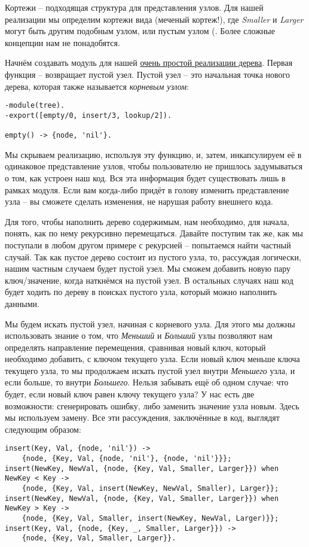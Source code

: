 Кортежи \--- подходящая структура для представления узлов.
Для нашей реализации мы определим кортежи вида  (меченый кортеж!), где \emph{Smaller} и \emph{Larger} могут быть другим подобным узлом, или пустым узлом (.
Более сложные концепции нам не понадобятся.

Начнём создавать модуль для нашей \href{http://learnyousomeerlang.com/static/erlang/tree.erl}{очень простой реализации дерева}.
Первая функция  \--- возвращает пустой узел.
Пустой узел \--- это начальная точка нового дерева, которая также называется \emph{корневым узлом}:
\begin{lstlisting}[style=erlang]
-module(tree).
-export([empty/0, insert/3, lookup/2]).
 
empty() -> {node, 'nil'}.
\end{lstlisting}

Мы скрываем реализацию, используя эту функцию, и, затем, инкапсулируем её в одинаковое представление узлов, чтобы пользователю не пришлось задумываться о том, как устроен наш код.
Вся эта информация будет существовать лишь в рамках модуля.
Если вам когда\--либо придёт в голову изменить представление узла \--- вы сможете сделать изменения, не нарушая работу внешнего кода.

Для того, чтобы наполнить дерево содержимым, нам необходимо, для начала, понять, как по нему рекурсивно перемещаться.
Давайте поступим так же, как мы поступали в любом другом примере с рекурсией \--- попытаемся найти частный случай.
Так как пустое дерево состоит из пустого узла, то, рассуждая логически, нашим частным случаем будет пустой узел.
Мы сможем добавить новую пару ключ/значение, когда наткнёмся на пустой узел.
В остальных случаях наш код будет ходить по дереву в поисках пустого узла, который можно наполнить данными.

Мы будем искать пустой узел, начиная с корневого узла.
Для этого мы должны использовать знание о том, что \emph{Меньший} и \emph{Больший} узлы позволяют нам определять направление перемещения, сравнивая новый ключ, который необходимо добавить, с ключом текущего узла.
Если новый ключ меньше ключа текущего узла, то мы продолжаем искать пустой узел внутри \emph{Меньшего} узла, и если больше, то внутри \emph{Большего}.
Нельзя забывать ещё об одном случае: что будет, если новый ключ равен ключу текущего узла?
У нас есть две возможности: сгенерировать ошибку, либо заменить значение узла новым.
Здесь мы используем замену.
Все эти рассуждения, заключённые в код, выглядят следующим образом:
\begin{lstlisting}[style=erlang]
insert(Key, Val, {node, 'nil'}) ->
    {node, {Key, Val, {node, 'nil'}, {node, 'nil'}}};
insert(NewKey, NewVal, {node, {Key, Val, Smaller, Larger}}) when NewKey < Key ->
    {node, {Key, Val, insert(NewKey, NewVal, Smaller), Larger}};
insert(NewKey, NewVal, {node, {Key, Val, Smaller, Larger}}) when NewKey > Key ->
    {node, {Key, Val, Smaller, insert(NewKey, NewVal, Larger)}};
insert(Key, Val, {node, {Key, _, Smaller, Larger}}) ->
    {node, {Key, Val, Smaller, Larger}}.
\end{lstlisting}

